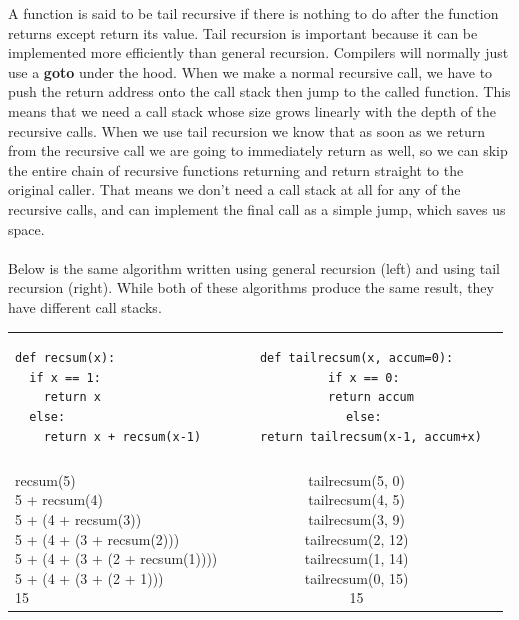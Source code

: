\documentclass[9pt]{extarticle} %
\begin{document}
\begin{minipage}[t]{.66\linewidth} %
\vspace{-0.4cm}
\hypertarget{firstnews}{}
	A function is said to be tail recursive if there is nothing to do after the function returns except return its value. Tail recursion is important because it can be implemented more efficiently than general recursion. Compilers will normally just use a \textbf{goto} under the hood. When we make a normal recursive call, we have to push the return address onto the call stack then jump to the called function. This means that we need a call stack whose size grows linearly with the depth of the recursive calls. When we use tail recursion we know that as soon as we return from the recursive call we are going to immediately return as well, so we can skip the entire chain of recursive functions returning and return straight to the original caller. That means we don't need a call stack at all for any of the	recursive calls, and can implement the final call as a simple jump, which saves us space. \\
\\
Below is the same algorithm written using general recursion (left) and using tail recursion (right). While both of these algorithms produce the same result, they have different call stacks. \\

\begin{tabular}{ l c r }
\begin{lstlisting}
def recsum(x):
  if x == 1:
    return x
  else:
    return x + recsum(x-1)
\end{lstlisting}
&
\begin{lstlisting}
def tailrecsum(x, accum=0):
  if x == 0:
    return accum
  else:
    return tailrecsum(x-1, accum+x)
\end{lstlisting}
\\
\\
\makecell{
recsum(5) \\
5 + recsum(4) \\
5 + (4 + recsum(3)) \\
5 + (4 + (3 + recsum(2))) \\
5 + (4 + (3 + (2 + recsum(1)))) \\
5 + (4 + (3 + (2 + 1))) \\
15 \\}

&
\makecell{
tailrecsum(5, 0) \\
tailrecsum(4, 5) \\
tailrecsum(3, 9) \\
tailrecsum(2, 12) \\
tailrecsum(1, 14) \\
tailrecsum(0, 15) \\
15 \\}
\end{tabular}


\end{minipage}
\end{document}
